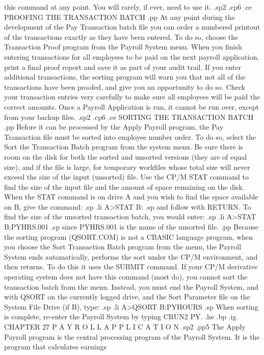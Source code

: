 this command at any point.  You will rarely, if ever, need to use it.
.sp2
.cp6
.ce
PROOFING THE TRANSACTION BATCH
.pp
At any point during the development of the Pay Transaction batch file
you can order a numbered printout of the transactions exactly as
they have been entered.  To do so, choose the Transaction Proof
program from the Payroll System menu.  When you finish entering
transactions for all employees to be paid on the next payroll application,
print a final proof report and save it as part of your audit trail.
If you enter additional transactions, the sorting program will warn you
that not all of the transactions have been proofed, and give you an
opportunity to do so.  Check your transaction entries very carefully to
make sure all employees will be paid the correct amounts.  Once a
Payroll Application is run, it cannot be run over, except from your backup
files.
.sp2
.cp6
.ce
SORTING THE TRANSACTION BATCH
.pp
Before it can be processed by the Apply Payroll program, the
Pay Transaction file must be sorted into employee number order.
To do so, select the Sort the Transaction Batch program from the
system menu.  Be sure there is room on the disk for both the sorted
and unsorted versions (they are of equal size), and if the file
is large, for temporary workfiles whose total size will never exceed
the size of the input (unsorted) file.	 Use the CP/M STAT command
to find the size of the input file and the amount of space remaining on
the disk. When the STAT command is on drive A and you wish to find the
space available on B, give the command:
.sp
.li
		A>STAT B:
.sp
and follow with RETURN.  To find the size of the unsorted transaction
batch, you would enter:
.sp
.li
		A>STAT B:PYHRS.001
.sp
since PYHRS.001 is the name of the unsorted file.
.pp
Because the sorting program (QSORT.COM) is not a CBASIC language program,
when you choose the Sort Transaction Batch program from the menu, the
Payroll System ends automatically, performs the sort under the CP/M
environment, and then returns.	To do this it uses the SUBMIT command.
If your CP/M derivative operating system does not have this command (most
do), you
cannot sort the transaction batch from the menu.  Instead, you must
end the Payroll System, and with QSORT on the currently logged drive, and
the Sort Parameter file
on the System File Drive (if B), type:
.sp
.li
		A>QSORT B:PYHOURS
.sp
When sorting is complete, re-enter the Payroll System by typing
CRUN2 PY.
.he
.bp
.ig
CHAPTER 27
P A Y R O L L	 A P P L I C A T I O N
.sp2
.pp5
The Apply Payroll program is the central processing program of
the Payroll System.  It is the program that calculates earnings
